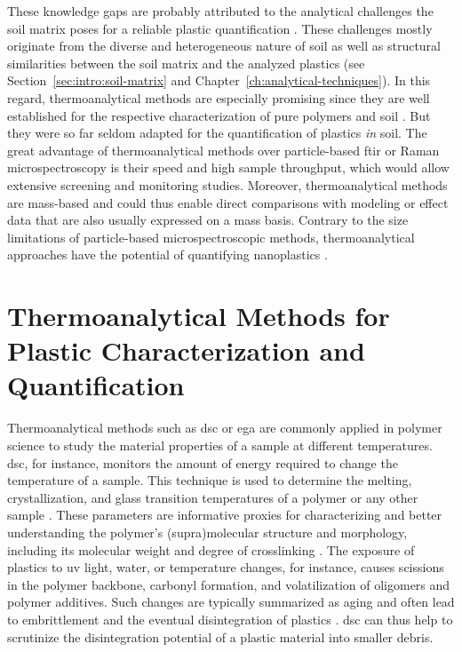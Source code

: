 These knowledge gaps are probably attributed to the analytical challenges the soil matrix poses for a reliable plastic quantification \citep{QiBehavior2020}. These challenges mostly originate from the diverse and heterogeneous nature of soil as well as structural similarities between the soil matrix and the analyzed plastics (see Section~\ref{sec:intro:soil-matrix} and Chapter~\ref{ch:analytical-techniques}).
In this regard, thermoanalytical methods are especially promising since they are well established for the respective characterization of pure polymers and soil \citep{PicoPyrolysis2020}. But they were so far seldom adapted for the quantification of plastics \emph{in} soil. The great advantage of thermoanalytical methods over particle-based \ac{ftir} or Raman microspectroscopy is their speed and high sample throughput, which would allow extensive screening and monitoring studies. Moreover, thermoanalytical methods are mass-based and could thus enable direct comparisons with modeling or effect data that are also usually expressed on a mass basis. Contrary to the size limitations of particle-based microspectroscopic methods, thermoanalytical approaches have the potential of quantifying nanoplastics \citep[Chapter~\ref{ch:analytical-techniques};][]{ParoliniEmerging2021}.

\section{Thermoanalytical Methods for Plastic Characterization and Quantification}
\label{sec:intro:thermoanalysis}

Thermoanalytical methods such as \ac{dsc} or \ac{ega} are commonly applied in polymer science to study the material properties of a sample at different temperatures. \Ac{dsc}, for instance, monitors the amount of energy required to change the temperature of a sample. This technique is used to determine the melting, crystallization, and glass transition temperatures of a polymer or any other sample \citep{MenczelDifferential2009}. These parameters are informative proxies for characterizing and better understanding the polymer's (supra)molecular structure and morphology, including its molecular weight and degree of crosslinking \citep{BialeSystematic2021}. The exposure of plastics to \ac{uv} light, water, or temperature changes, for instance, causes scissions in the polymer backbone, carbonyl formation, and volatilization of oligomers and polymer additives. Such changes are typically summarized as aging and often lead to embrittlement and the eventual disintegration of plastics \citep{VolynskiiStructural2007,WhitePolymer2006}. \Ac{dsc} can thus help to scrutinize the disintegration potential of a plastic material into smaller debris.

